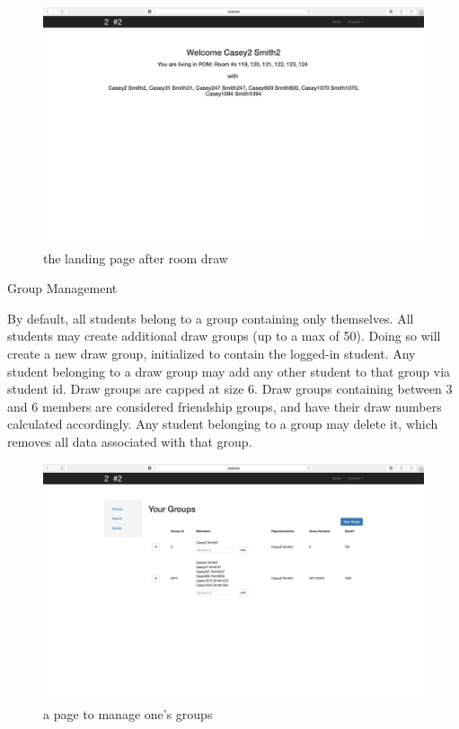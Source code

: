 \begin{outline}
\begin{figure}[H] \centering
\includegraphics[scale=.225]{screens/landing_drawn}
\caption{the landing page after room draw}
\label{fig:screenlandingdrawn}
\end{figure}
    
\1 Group Management

  \2 By default, all students belong to a group containing only themselves.
  \2 All students may create additional draw groups (up to a max of 50). Doing
  so will create a new draw group, initialized to contain the logged-in student.
  \2 Any student belonging to a draw group may add any other student to that
  group via student id. Draw groups are capped at size 6. Draw groups containing
  between 3 and 6 members are considered friendship groups, and have their draw
  numbers calculated accordingly.
  \2 Any student belonging to a group may delete it, which removes all data
  associated with that group.

\begin{figure}[H] \centering
\includegraphics[scale=.225]{screens/group}
\caption{a page to manage one's groups}
\label{fig:screengroup}
\end{figure}
  

\end{outline}
